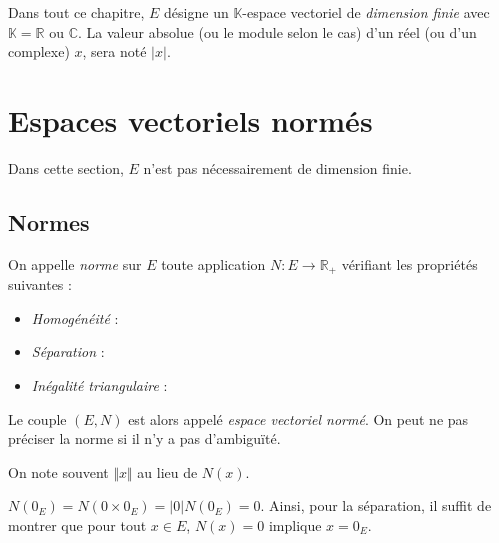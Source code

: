 \documentclass[french,11pt,twoside]{VcCours}
\begin{document}

\tableofcontents
\separationTitre


Dans tout ce chapitre, $E$ désigne un $\mathbb{K}$-espace vectoriel de \emph{dimension finie} avec $\mathbb{K}= \mathbb{R}$ ou $\mathbb{C}$. La valeur absolue (ou le module selon le cas) d'un réel (ou d'un complexe) $x$, sera noté $\vert x \vert$.

 \section{Espaces vectoriels normés}
 
 Dans cette section, $E$ n'est pas nécessairement de dimension finie.
 
 \subsection{Normes}
 
 \begin{Definition}{} On appelle \emph{norme} sur $E$ toute application $N : E \rightarrow \mathbb{R}_+$ vérifiant les propriétés suivantes :
 
 \begin{itemize}
 \item \emph{Homogénéité} :
 
 \item \emph{Séparation} :
 
 \item \emph{Inégalité triangulaire} :
 
 \end{itemize}
 
Le couple $(E,N)$ est alors appelé \emph{espace vectoriel normé}. On peut ne pas préciser la norme si il n'y a pas d'ambiguïté.
\end{Definition}
 
 \begin{Remarque}{} On note souvent $\Vert x \Vert$ au lieu de $N(x)$.
 \end{Remarque}
 
 \begin{Remarque}{} $N(0_E) = N(0 \times 0_E) = \vert 0 \vert N(0_E) = 0$. Ainsi, pour la séparation, il suffit de montrer que pour tout $x \in E$, $N(x)=0$ implique $x=0_E$.
 \end{Remarque}
 
\end{document}

